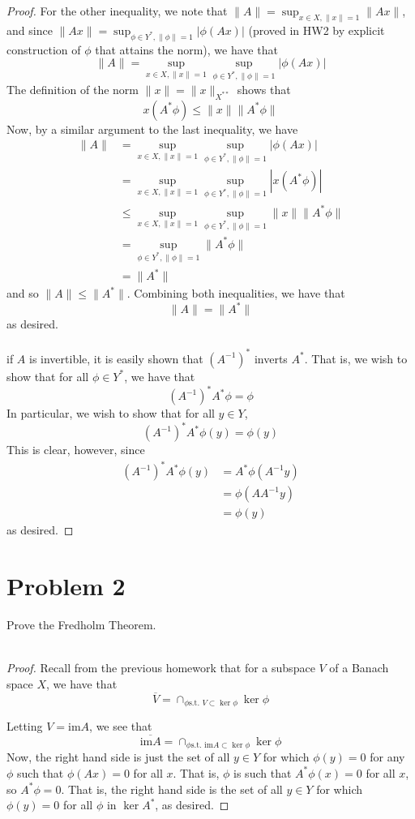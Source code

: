 \documentclass[fontsize=11pt]{scrartcl} %
\numberwithin{equation}{section} %
\numberwithin{figure}{section} %
\numberwithin{table}{section} %
\newcommand{\im}{\textrm{im}}
\begin{document}
\begin{proof}
    For the other inequality, we note that $\|A\| = \sup_{x\in
    X,\|x\|=1}\|Ax\|$, and since $\|Ax\| = \sup_{\phi\in
    Y^*,\|\phi\|=1}|\phi(Ax)|$ (proved in HW2 by explicit construction of
    $\phi$ that attains the norm), we have that
    \[
        \|A\| = \sup_{x\in X,\|x\|=1}\sup_{\phi\in Y^*,\|\phi\|=1} |\phi(Ax)|
    \]
    The definition of the norm $\|x\| = \|x\|_{X^{**}}$ shows that
    \[
        x(A^*\phi) \leq \|x\|\|A^*\phi\|
    \]
    Now, by a similar argument to the last inequality, we have
    \[
        \begin{aligned}
            \|A\| &= \sup_{x\in X,\|x\|=1}\sup_{\phi\in Y^*,\|\phi\|=1}
            |\phi(Ax)|\\
            &= \sup_{x\in X,\|x\|=1}\sup_{\phi\in Y^*,\|\phi\|=1}
            |x(A^*\phi)|\\
            &\leq \sup_{x\in X,\|x\|=1}\sup_{\phi\in Y^*,\|\phi\|=1}
            \|x\|\|A^*\phi\|\\
            &=\sup_{\phi\in Y^*,\|\phi\|=1}\|A^*\phi\|\\
            &=\|A^*\|
        \end{aligned}
    \]
    and so $\|A\|\leq \|A^*\|$. Combining both inequalities, we have that
    \[
        \|A\|=\|A^*\|
    \]
    as desired.
    \\
    \\
    if $A$ is invertible, it is easily shown that $(A^{-1})^*$ inverts $A^*$.
    That is, we wish to show that for all $\phi\in Y^*$, we have that
    \[
        (A^{-1})^*A^*\phi = \phi
    \]
    In particular, we wish to show that for all $y\in Y$,
    \[
        (A^{-1})^*A^*\phi(y) = \phi(y)
    \]
    This is clear, however, since
    \[
        \begin{aligned}
            (A^{-1})^*A^*\phi(y) &= A^*\phi(A^{-1}y)\\
                &= \phi(AA^{-1}y)\\
                &=\phi(y)
        \end{aligned}
    \]
    as desired.
\end{proof}

\section*{Problem 2}
Prove the Fredholm Theorem.
\\
\\
\begin{proof}
    Recall from the previous homework that for a subspace $V$ of a Banach space
    $X$, we have that
    \[
        \overline{V} = \cap_{\phi \text{s.t. } V\subset\ker\phi}\ker\phi
    \]

    Letting $V=\im A$, we see that
    \[
        \overline{\im A} = \cap_{\phi \text{s.t. } \im A\subset\ker\phi}\ker\phi
    \]
    Now, the right hand side is just the set of all $y\in Y$ for which
    $\phi(y)=0$ for any $\phi$ such that $\phi(Ax) = 0$ for all $x$. That is,
    $\phi$ is such that $A^*\phi(x) = 0$ for all $x$, so $A^*\phi = 0$. That is,
    the right hand side is the set of all $y\in Y$ for which $\phi(y) = 0$ for
    all $\phi$ in $\ker A^*$, as desired.
\end{proof}
\end{document}
